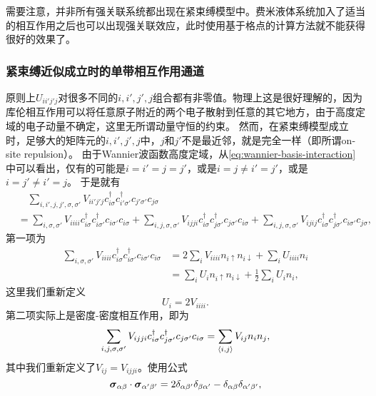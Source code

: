 需要注意，并非所有强关联系统都出现在紧束缚模型中。费米液体系统加入了适当的相互作用之后也可以出现强关联效应，此时使用基于格点的计算方法就不能获得很好的效果了。

\subsubsection{紧束缚近似成立时的单带相互作用通道}\label{sec:single-band-interaction-channel}

原则上$U_{i i' j' j}$对很多不同的$i, i', j', j$组合都有非零值。物理上这是很好理解的，因为库伦相互作用可以将任意原子附近的两个电子散射到任意的其它地方，由于高度定域的电子动量不确定，这里无所谓动量守恒的约束。
然而，在紧束缚模型成立时，足够大的矩阵元的$i, i', j', j$中，$j$和$j'$不是最近邻，就是完全一样（即所谓on-site repulsion）。
由于Wannier波函数高度定域，从\eqref{eq:wannier-basis-interaction}中可以看出，仅有的可能是$i=i'=j=j'$，或是$i=j \neq i'=j'$，或是$i=j' \neq i' = j$。
于是就有
\[
    \begin{aligned}
        &\quad \sum_{i, i', j, j', \sigma, \sigma'} V_{i i' j' j} c^\dagger_{i \sigma} c^\dagger_{i' \sigma'} c_{j' \sigma'} c_{j \sigma} \\
        &= \sum_{i, \sigma, \sigma'} V_{iiii} c^\dagger_{i \sigma} c^\dagger_{i \sigma'} c_{i \sigma'} c_{i \sigma} 
        + \sum_{i, j, \sigma, \sigma'} V_{i j j i} c^\dagger_{i \sigma} c^\dagger_{j \sigma'} c_{j \sigma'} c_{i \sigma}
        + \sum_{i, j, \sigma, \sigma'} V_{i j i j} c^\dagger_{i \sigma} c^\dagger_{j \sigma'} c_{i \sigma'} c_{j \sigma},
    \end{aligned}
\]
第一项为
\[
    \begin{aligned}
        \sum_{i, \sigma, \sigma'} V_{iiii} c^\dagger_{i \sigma} c^\dagger_{i \sigma'} c_{i \sigma'} c_{i \sigma} &= 2 \sum_{i} V_{iiii} n_{i \uparrow} n_{i \downarrow} + \sum_{i} U_{iiii} n_i \\
        &= \sum_{i} U_i n_{i \uparrow} n_{i \downarrow} + \frac{1}{2} \sum_{i} U_{i} n_i,
    \end{aligned}
\]
这里我们重新定义
\begin{equation}
    U_i = 2 V_{iiii}.
\end{equation}
第二项实际上是密度-密度相互作用，即为
\[
    \sum_{i, j, \sigma, \sigma'} V_{i j j i} c^\dagger_{i \sigma} c^\dagger_{j \sigma'} c_{j \sigma'} c_{i \sigma} = \sum_{\langle i, j \rangle} V_{ij} n_i n_j,
\]
其中我们重新定义了$V_{ij} = V_{ijji}$。使用公式
\[
    \vb*{\sigma}_{\alpha \beta} \cdot \vb*{\sigma}_{\alpha' \beta'} = 2 \delta_{\alpha \beta'} \delta_{\beta \alpha'} - \delta_{\alpha \beta} \delta_{\alpha' \beta'},
\]

